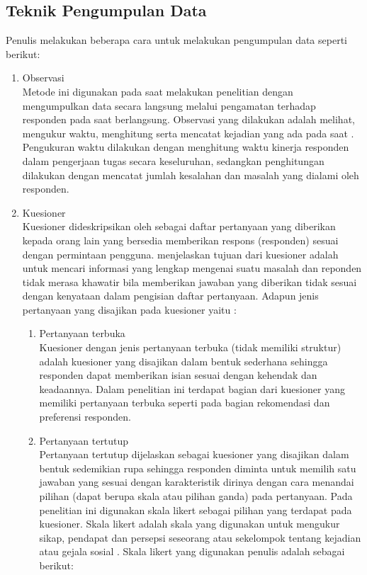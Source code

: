 \subsection{Teknik Pengumpulan Data}
Penulis melakukan beberapa cara untuk melakukan pengumpulan data seperti berikut:
\begin{enumerate}
	\item Observasi\\
	Metode ini digunakan pada saat melakukan penelitian dengan mengumpulkan data secara langsung melalui pengamatan terhadap responden pada saat \ust \space berlangsung. Observasi yang dilakukan adalah melihat, mengukur waktu, menghitung serta mencatat kejadian yang ada pada saat \ust. Pengukuran waktu dilakukan dengan menghitung waktu kinerja responden dalam pengerjaan tugas secara keseluruhan, sedangkan penghitungan dilakukan dengan mencatat jumlah kesalahan dan masalah yang dialami oleh responden.
	\item Kuesioner\\
	Kuesioner dideskripsikan oleh \citet{buku.riduwan} sebagai daftar pertanyaan yang diberikan kepada orang lain yang bersedia memberikan respons (responden) sesuai dengan permintaan pengguna. \citeauthor{buku.riduwan} menjelaskan tujuan dari kuesioner adalah untuk mencari informasi yang lengkap mengenai suatu masalah dan reponden tidak merasa khawatir bila memberikan jawaban yang diberikan tidak sesuai dengan kenyataan dalam pengisian daftar pertanyaan.
	Adapun jenis pertanyaan yang disajikan pada kuesioner yaitu \citep{buku.riduwan}:
	\begin{enumerate}
		\item Pertanyaan terbuka\\
		Kuesioner dengan jenis pertanyaan terbuka (tidak memiliki struktur) adalah kuesioner yang disajikan dalam bentuk sederhana sehingga responden dapat memberikan isian sesuai dengan kehendak dan keadaannya. Dalam penelitian ini terdapat bagian dari kuesioner yang memiliki pertanyaan terbuka seperti pada bagian rekomendasi dan preferensi responden.
		\item Pertanyaan tertutup\\
		Pertanyaan tertutup dijelaskan sebagai kuesioner yang disajikan dalam bentuk sedemikian rupa sehingga responden diminta untuk memilih satu jawaban yang sesuai dengan karakteristik dirinya dengan cara menandai pilihan (dapat berupa skala atau pilihan ganda) pada pertanyaan. Pada penelitian ini digunakan skala likert sebagai pilihan yang terdapat pada kuesioner. Skala likert adalah skala yang digunakan untuk mengukur sikap, pendapat dan persepsi seseorang atau sekelompok tentang kejadian atau gejala sosial \citep{buku.riduwan}. Skala likert yang digunakan penulis adalah sebagai berikut:

\end{enumerate}
\end{enumerate}
